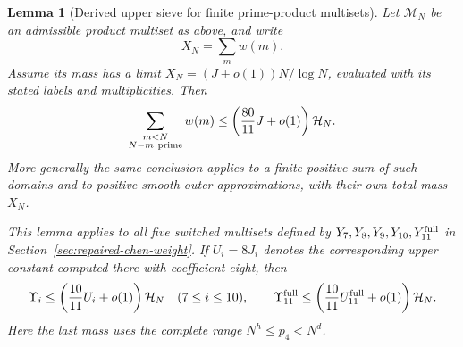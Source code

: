 \documentclass[11pt]{article}
\newtheorem{lemma}[theorem]{Lemma}
\newcommand{\HN}{\mathcal H_N}
\begin{document}
\begin{lemma}[Derived upper sieve for finite prime-product multisets]
\label{lem:primeproducts55}
Let $\mathcal M_N$ be an admissible product multiset as above,
and write
\[
 X_N=\sum_m w(m).
\]
Assume its mass has a limit
$X_N=(J+o(1))N/\log N$, evaluated with its stated labels and
multiplicities. Then
\begin{equation}\label{eq:primeproduct-prime-upper}
 \sum_{\substack{m<N\\N-m\ {\rm prime}}}w(m)
 \le\left(\frac{80}{11}J+o(1)\right)\HN .
\end{equation}
More generally the same conclusion applies to a finite positive
sum of such domains and to positive smooth outer approximations,
with their own total mass $X_N$.

This lemma applies to all five switched multisets defined by
$Y_7,Y_8,Y_9,Y_{10},Y_{11}^{\rm full}$ in
Section~\ref{sec:repaired-chen-weight}. If $U_i=8J_i$ denotes
the corresponding upper constant computed there with coefficient
eight, then
\begin{equation}\label{eq:switch-55}
 \Upsilon_i\le\left(\frac{10}{11}U_i+o(1)\right)\HN
 \quad(7\le i\le10),\qquad
 \Upsilon_{11}^{\rm full}
       \le\left(\frac{10}{11}U_{11}^{\rm full}+o(1)\right)\HN.
\end{equation}
Here the last mass uses the complete range
$N^h\le p_4<N^d$.
\end{lemma}
\end{document}
